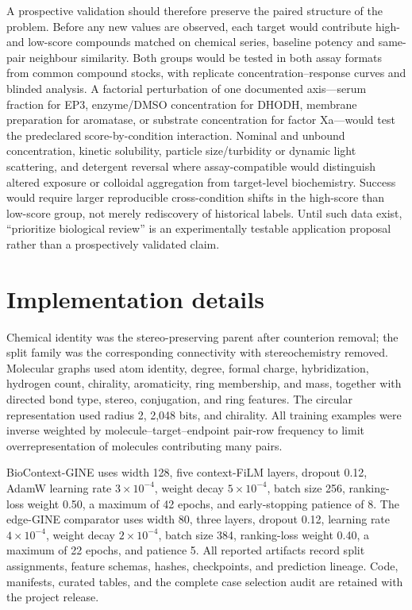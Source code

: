\documentclass[letterpaper]{article}
\begin{document}
A prospective validation should therefore preserve the paired structure of the problem. Before any new values are observed, each target would contribute high- and low-score compounds matched on chemical series, baseline potency and same-pair neighbour similarity. Both groups would be tested in both assay formats from common compound stocks, with replicate concentration--response curves and blinded analysis. A factorial perturbation of one documented axis---serum fraction for EP3, enzyme/DMSO concentration for DHODH, membrane preparation for aromatase, or substrate concentration for factor Xa---would test the predeclared score-by-condition interaction. Nominal and unbound concentration, kinetic solubility, particle size/turbidity or dynamic light scattering, and detergent reversal where assay-compatible would distinguish altered exposure or colloidal aggregation from target-level biochemistry. Success would require larger reproducible cross-condition shifts in the high-score than low-score group, not merely rediscovery of historical labels. Until such data exist, ``prioritize biological review'' is an experimentally testable application proposal rather than a prospectively validated claim.

\section{Implementation details}

Chemical identity was the stereo-preserving parent after counterion removal; the split family was the corresponding connectivity with stereochemistry removed. Molecular graphs used atom identity, degree, formal charge, hybridization, hydrogen count, chirality, aromaticity, ring membership, and mass, together with directed bond type, stereo, conjugation, and ring features. The circular representation used radius 2, 2,048 bits, and chirality. All training examples were inverse weighted by molecule--target--endpoint pair-row frequency to limit overrepresentation of molecules contributing many pairs.

BioContext-GINE uses width 128, five context-FiLM layers, dropout 0.12, AdamW learning rate $3\times10^{-4}$, weight decay $5\times10^{-4}$, batch size 256, ranking-loss weight 0.50, a maximum of 42 epochs, and early-stopping patience of 8. The edge-GINE comparator uses width 80, three layers, dropout 0.12, learning rate $4\times10^{-4}$, weight decay $2\times10^{-4}$, batch size 384, ranking-loss weight 0.40, a maximum of 22 epochs, and patience 5. All reported artifacts record split assignments, feature schemas, hashes, checkpoints, and prediction lineage. Code, manifests, curated tables, and the complete case selection audit are retained with the project release.
\end{document}
